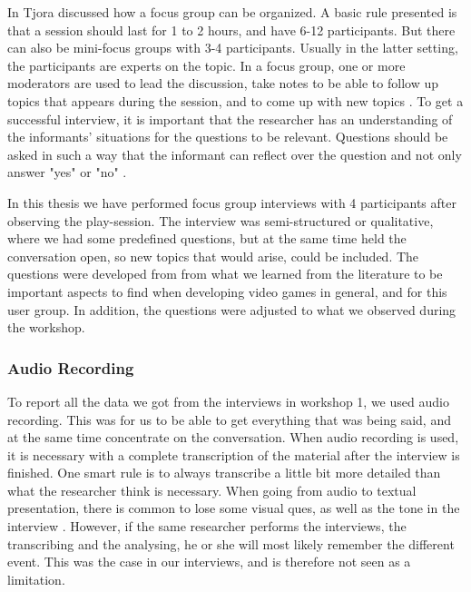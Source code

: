 In \cite{tjora} Tjora discussed how a focus group can be organized.  A basic rule presented is that a session should last for 1 to 2 hours, and have 6-12 participants. But there can also be mini-focus groups with 3-4 participants. Usually in the latter setting, the participants are experts on the topic. In a focus group, one or more moderators are used to lead the discussion, take notes to be able to follow up topics that appears during the session, and to come up with new topics \cite{tjora}. To get a successful interview, it is important that the researcher has an understanding of the informants’ situations for the questions to be relevant. Questions should be asked in such a way that the informant can reflect over the question and not only answer "yes" or "no" \cite{qualitative}.

In this thesis we have performed focus group interviews with 4 participants after observing the play-session. The interview was semi-structured or qualitative, where we had some predefined questions, but at the same time held the conversation open, so new topics that would arise, could be included. The questions were developed from from what we learned from the literature to be important aspects to find when developing video games in general, and for this user group. In addition, the questions were adjusted to what we observed during the workshop. 

\subsubsection{Audio Recording}
To report all the data we got from the interviews in workshop 1, we used audio recording. This was for us to be able to get everything that was being said, and at the same time concentrate on the conversation. When audio recording is used, it is necessary with a complete transcription of the material after the interview is finished. One smart rule is to always transcribe a little bit more detailed than what the researcher think is necessary. When going from audio to textual presentation, there is common to lose some visual ques, as well as the tone in the interview \cite{tjora}. However, if the same researcher performs the interviews, the transcribing and the analysing, he or she will most likely remember the different event. This was the case in our interviews, and is therefore not seen as a limitation. 

